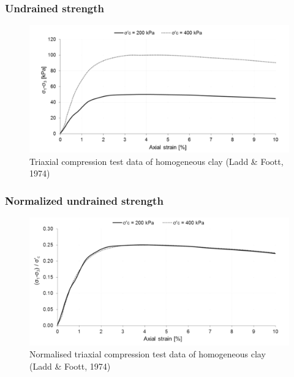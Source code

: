 \documentclass[notes]{beamer}
\begin{document}
\begin{frame}
	\frametitle{Undrained strength}
	\begin{figure}
		\includegraphics[width=\textwidth]{figs/effect-sigma_c.png}
		\caption*{Triaxial compression test data of homogeneous clay (Ladd \& Foott, 1974)}
	\end{figure}
\end{frame}


\begin{frame}
	\frametitle{Normalized undrained strength}
	\begin{figure}
		\includegraphics[width=\textwidth]{figs/su_normalised.png}
		\caption*{Normalised triaxial compression test data of homogeneous clay (Ladd \& Foott, 1974)}
	\end{figure}
\end{frame}
\end{document}

